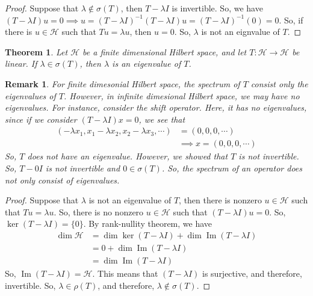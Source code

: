\documentclass{beamer}
\newtheorem{thm}{Theorem}
\newtheorem{rem}{Remark}
\newcommand{\im}{\operatorname{Im}}
\begin{document}
  \begin{frame}{\subsecname}
    \begin{proof}
      Suppose that $\lambda\notin\sigma(T)$, then $T-\lambda I$ is invertible. So, we have $(T-\lambda I)u=0\implies u = (T-\lambda I)^{-1}(T-\lambda I)u = (T-\lambda I)^{-1}(0)=0$. So, if there is $u\in\mathcal{H}$ such that $Tu=\lambda u$, then $u=0$. So, $\lambda$ is not an eignvalue of $T$.
    \end{proof}
  \end{frame}

  \begin{frame}{\subsecname}
    \begin{thm}
      Let $\mathcal{H}$ be a finite dimensional Hilbert space, and let $T:\mathcal{H}\to\mathcal{H}$ be linear. If $\lambda\in\sigma(T)$, then $\lambda$ is an eigenvalue of $T$.
    \end{thm}
  \end{frame}

  \begin{frame}{\subsecname}
    \begin{rem}
    For finite dimesonial Hilbert space, the spectrum of $T$ consist only the eigenvalues of $T$. However, in infinite dimesional Hilbert space, we may have no eigenvalues. For instance, consider the shift operator. Here, it has no eigenvalues, since if we consider $(T-\lambda I)x=0$, we see that
    $$
    \begin{aligned}
      (-\lambda x_{1}, x_{1}-\lambda x_{2}, x_{2}-\lambda x_{3},\cdots)&=(0,0,0,\cdots)\\
                                                                       &\implies x = (0,0,0,\cdots)
    \end{aligned}
    $$
    So, $T$ does not have an eigenvalue. However, we showed that $T$ is not invertible. So, $T-0I$ is not invertible and $0\in\sigma(T)$. So, the spectrum of an operator does not only consist of eigenvalues.
    \end{rem}
  \end{frame}

  \begin{frame}{\subsecname}
    \begin{proof}
      Suppose that $\lambda$ is not an eigenvalue of $T$, then there is nonzero $u\in \mathcal{H}$ such that $Tu=\lambda u$. So, there is no nonzero $u\in\mathcal{H}$ such that $(T-\lambda I)u=0$. So, $\ker(T-\lambda I)=\{0\}$. By rank-nullity theorem, we have
      $$
      \begin{aligned}
        \dim\mathcal{H} &= \dim\ker(T-\lambda I) + \dim\im(T-\lambda I) \\
               &= 0 + \dim\im(T-\lambda I) \\
               &= \dim\im(T-\lambda I)
      \end{aligned}
      $$
      So, $\im(T-\lambda I)=\mathcal{H}$. This means that $(T-\lambda I)$ is surjective, and therefore, invertible. So, $\lambda\in\rho(T)$, and therefore, $\lambda\notin\sigma(T)$.
    \end{proof}
  \end{frame}
\end{document}
